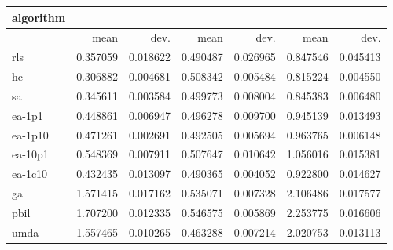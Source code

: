 \begin{tabular}{@{}l*{6}{>{{}}N{1}{2}}@{}}
\toprule
{algorithm} &  &  &  \\
\midrule
& {mean} & {dev.} & {mean} & {dev.} & {mean} & {dev.} \\
\midrule
rls & 0.357059 & 0.018622 & 0.490487 & 0.026965 & 0.847546 & 0.045413 \\
 hc & 0.306882 & 0.004681 & 0.508342 & 0.005484 & 0.815224 & 0.004550 \\
 sa & 0.345611 & 0.003584 & 0.499773 & 0.008004 & 0.845383 & 0.006480 \\
 ea-1p1 & 0.448861 & 0.006947 & 0.496278 & 0.009700 & 0.945139 & 0.013493 \\
 ea-1p10 & 0.471261 & 0.002691 & 0.492505 & 0.005694 & 0.963765 & 0.006148 \\
 ea-10p1 & 0.548369 & 0.007911 & 0.507647 & 0.010642 & 1.056016 & 0.015381 \\
 ea-1c10 & 0.432435 & 0.013097 & 0.490365 & 0.004052 & 0.922800 & 0.014627 \\
 ga & 1.571415 & 0.017162 & 0.535071 & 0.007328 & 2.106486 & 0.017577 \\
 pbil & 1.707200 & 0.012335 & 0.546575 & 0.005869 & 2.253775 & 0.016606 \\
 umda & 1.557465 & 0.010265 & 0.463288 & 0.007214 & 2.020753 & 0.013113 \\
 \bottomrule
\end{tabular}
